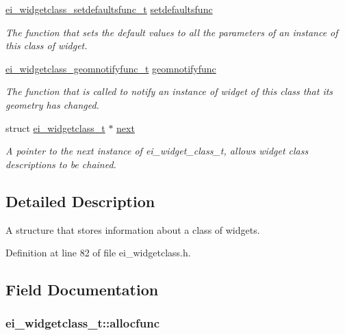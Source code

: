 \begin{DoxyCompactItemize}
\hyperlink{ei__widgetclass_8h_aa04d729c9dca14d3ac92c0f9aa8cc5cb}{ei\-\_\-widgetclass\-\_\-setdefaultsfunc\-\_\-t} \hyperlink{structei__widgetclass__t_a5fec706eefca10172d897cf61b268510}{setdefaultsfunc}
\begin{DoxyCompactList}\small\item\em The function that sets the default values to all the parameters of an instance of this class of widget. \end{DoxyCompactList}\item 
\hyperlink{ei__widgetclass_8h_a751dc2e4c264c3597fcc2d59878f6265}{ei\-\_\-widgetclass\-\_\-geomnotifyfunc\-\_\-t} \hyperlink{structei__widgetclass__t_aaf0aa3f54a48a6b3f8b8e12574ede4b7}{geomnotifyfunc}
\begin{DoxyCompactList}\small\item\em The function that is called to notify an instance of widget of this class that its geometry has changed. \end{DoxyCompactList}\item 
struct \hyperlink{structei__widgetclass__t}{ei\-\_\-widgetclass\-\_\-t} $\ast$ \hyperlink{structei__widgetclass__t_aa184e650475ec2451f033858db1876f0}{next}
\begin{DoxyCompactList}\small\item\em A pointer to the next instance of ei\-\_\-widget\-\_\-class\-\_\-t, allows widget class descriptions to be chained. \end{DoxyCompactList}\end{DoxyCompactItemize}


\subsection{Detailed Description}
A structure that stores information about a class of widgets. 

Definition at line 82 of file ei\-\_\-widgetclass.\-h.



\subsection{Field Documentation}
\hypertarget{structei__widgetclass__t_a233446250cdde4347c1381427923d21a}{
\subsubsection[{allocfunc}]{ ei\-\_\-widgetclass\-\_\-t\-::allocfunc}}\label{structei__widgetclass__t_a233446250cdde4347c1381427923d21a}


